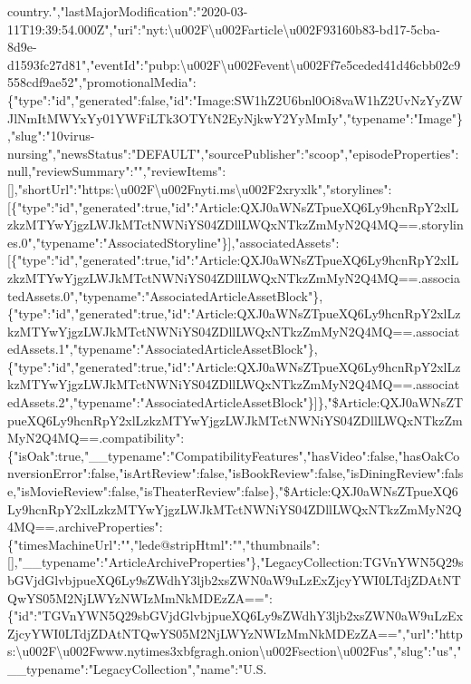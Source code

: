 country.","lastMajorModification":"2020-03-11T19:39:54.000Z","uri":"nyt:\textbackslash{}u002F\textbackslash{}u002Farticle\textbackslash{}u002F93160b83-bd17-5cba-8d9e-d1593fc27d81","eventId":"pubp:\textbackslash{}u002F\textbackslash{}u002Fevent\textbackslash{}u002Ff7e5ceded41d46cbb02c9558cdf9ae52","promotionalMedia":\{"type":"id","generated":false,"id":"Image:SW1hZ2U6bnl0Oi8vaW1hZ2UvNzYyZWJlNmItMWYxYy01YWFiLTk3OTYtN2EyNjkwY2YyMmIy","typename":"Image"\},"slug":"10virus-nursing","newsStatus":"DEFAULT","sourcePublisher":"scoop","episodeProperties":null,"reviewSummary":"","reviewItems":{[}{]},"shortUrl":"https:\textbackslash{}u002F\textbackslash{}u002Fnyti.ms\textbackslash{}u002F2xryxlk","storylines":{[}\{"type":"id","generated":true,"id":"Article:QXJ0aWNsZTpueXQ6Ly9hcnRpY2xlLzkzMTYwYjgzLWJkMTctNWNiYS04ZDllLWQxNTkzZmMyN2Q4MQ==.storylines.0","typename":"AssociatedStoryline"\}{]},"associatedAssets":{[}\{"type":"id","generated":true,"id":"Article:QXJ0aWNsZTpueXQ6Ly9hcnRpY2xlLzkzMTYwYjgzLWJkMTctNWNiYS04ZDllLWQxNTkzZmMyN2Q4MQ==.associatedAssets.0","typename":"AssociatedArticleAssetBlock"\},\{"type":"id","generated":true,"id":"Article:QXJ0aWNsZTpueXQ6Ly9hcnRpY2xlLzkzMTYwYjgzLWJkMTctNWNiYS04ZDllLWQxNTkzZmMyN2Q4MQ==.associatedAssets.1","typename":"AssociatedArticleAssetBlock"\},\{"type":"id","generated":true,"id":"Article:QXJ0aWNsZTpueXQ6Ly9hcnRpY2xlLzkzMTYwYjgzLWJkMTctNWNiYS04ZDllLWQxNTkzZmMyN2Q4MQ==.associatedAssets.2","typename":"AssociatedArticleAssetBlock"\}{]}\},"\$Article:QXJ0aWNsZTpueXQ6Ly9hcnRpY2xlLzkzMTYwYjgzLWJkMTctNWNiYS04ZDllLWQxNTkzZmMyN2Q4MQ==.compatibility":\{"isOak":true,"\_\_typename":"CompatibilityFeatures","hasVideo":false,"hasOakConversionError":false,"isArtReview":false,"isBookReview":false,"isDiningReview":false,"isMovieReview":false,"isTheaterReview":false\},"\$Article:QXJ0aWNsZTpueXQ6Ly9hcnRpY2xlLzkzMTYwYjgzLWJkMTctNWNiYS04ZDllLWQxNTkzZmMyN2Q4MQ==.archiveProperties":\{"timesMachineUrl":"","lede@stripHtml":"","thumbnails":{[}{]},"\_\_typename":"ArticleArchiveProperties"\},"LegacyCollection:TGVnYWN5Q29sbGVjdGlvbjpueXQ6Ly9sZWdhY3ljb2xsZWN0aW9uLzExZjcyYWI0LTdjZDAtNTQwYS05M2NjLWYzNWIzMmNkMDEzZA==":\{"id":"TGVnYWN5Q29sbGVjdGlvbjpueXQ6Ly9sZWdhY3ljb2xsZWN0aW9uLzExZjcyYWI0LTdjZDAtNTQwYS05M2NjLWYzNWIzMmNkMDEzZA==","url":"https:\textbackslash{}u002F\textbackslash{}u002Fwww.nytimes3xbfgragh.onion\textbackslash{}u002Fsection\textbackslash{}u002Fus","slug":"us","\_\_typename":"LegacyCollection","name":"U.S.
